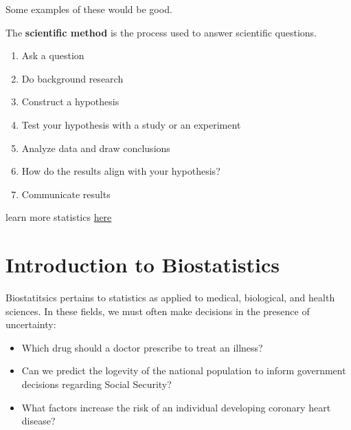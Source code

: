 \documentclass[
]{book}
\providecommand{\tightlist}{%
  \setlength{\itemsep}{0pt}\setlength{\parskip}{0pt}}
\theoremstyle{definition}
\theoremstyle{definition}
\theoremstyle{definition}
\theoremstyle{remark}
\begin{document}
Some examples of these would be good.

The \textbf{scientific method} is the process used to answer scientific questions.

\begin{enumerate}
\def\labelenumi{\arabic{enumi})}
\tightlist
\item
  Ask a question
\item
  Do background research
\item
  Construct a hypothesis
\item
  Test your hypothesis with a study or an experiment
\item
  Analyze data and draw conclusions
\item
  How do the results align with your hypothesis?
\item
  Communicate results
\end{enumerate}

learn more statistics \href{https://google.com}{here}

\hypertarget{ch1_s3}{%
\section{Introduction to Biostatistics}\label{ch1_s3}}

Biostatitsics pertains to statistics as applied to medical, biological, and health sciences. In these fields, we must often make decisions in the presence of uncertainty:

\begin{itemize}
\tightlist
\item
  Which drug should a doctor prescribe to treat an illness?\\
\item
  Can we predict the logevity of the national population to inform government decisions regarding Social Security?\\
\item
  What factors increase the risk of an individual developing coronary heart disease?
\end{itemize}
\end{document}
